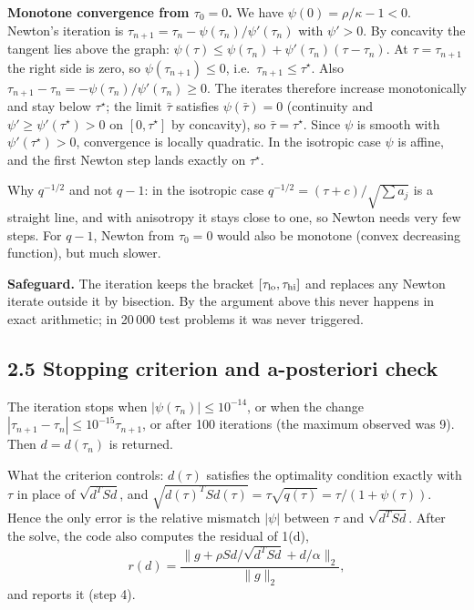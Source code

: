 \documentclass[11pt,a4paper]{article}
\newcommand{\norm}[1]{\lVert #1\rVert_2}
\begin{document}
\textbf{Monotone convergence from $\tau_0=0$.} We have $\psi(0)=\rho/\kappa-1<0$.
Newton's iteration is $\tau_{n+1}=\tau_n-\psi(\tau_n)/\psi'(\tau_n)$ with
$\psi'>0$. By concavity the tangent lies above the graph:
$\psi(\tau)\le\psi(\tau_n)+\psi'(\tau_n)(\tau-\tau_n)$. At $\tau=\tau_{n+1}$ the right
side is zero, so $\psi(\tau_{n+1})\le0$, i.e.\ $\tau_{n+1}\le\tau^\star$. Also
$\tau_{n+1}-\tau_n=-\psi(\tau_n)/\psi'(\tau_n)\ge0$. The iterates therefore increase
monotonically and stay below $\tau^\star$; the limit $\bar\tau$ satisfies
$\psi(\bar\tau)=0$ (continuity and $\psi'\ge\psi'(\tau^\star)>0$ on $[0,\tau^\star]$
by concavity), so $\bar\tau=\tau^\star$. Since $\psi$ is smooth with
$\psi'(\tau^\star)>0$, convergence is locally quadratic. In the isotropic case
$\psi$ is affine, and the first Newton step lands exactly on $\tau^\star$.

Why $q^{-1/2}$ and not $q-1$: in the isotropic case $q^{-1/2}=(\tau+c)/\sqrt{\sum a_j}$
is a straight line, and with anisotropy it stays close to one, so Newton needs very few
steps. For $q-1$, Newton from $\tau_0=0$ would also be monotone (convex decreasing
function), but much slower.

\textbf{Safeguard.} The iteration keeps the bracket $[\tau_{\rm lo},\tau_{\rm hi}]$
and replaces any Newton iterate outside it by bisection. By the argument above this
never happens in exact arithmetic; in 20\,000 test problems it was never triggered.

\subsection*{2.5 Stopping criterion and a-posteriori check}

The iteration stops when $|\psi(\tau_n)|\le10^{-14}$, or when the change
$|\tau_{n+1}-\tau_n|\le10^{-15}\tau_{n+1}$, or after 100 iterations (the maximum
observed was 9). Then $d=d(\tau_n)$ is returned.

What the criterion controls: $d(\tau)$ satisfies the optimality condition exactly
with $\tau$ in place of $\sqrt{d^TSd}$, and
$\sqrt{d(\tau)^TSd(\tau)}=\tau\sqrt{q(\tau)}=\tau/(1+\psi(\tau))$. Hence the only
error is the relative mismatch $|\psi|$ between $\tau$ and $\sqrt{d^TSd}$. After the
solve, the code also computes the residual of 1(d),
\begin{equation*}
r(d)=\frac{\norm{g+\rho Sd/\sqrt{d^TSd}+d/\alpha}}{\norm g},
\end{equation*}
and reports it (step 4).
\end{document}
